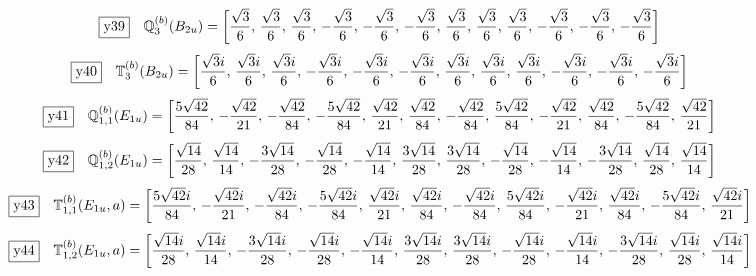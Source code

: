 \documentclass[fleqn,10pt,landscape]{jsarticle}
\begin{document}
\begin{dmath*}
\fbox{y39}\quad \mathbb{Q}_{3}^{(b)}(B_{2u})=\left[ \frac{\sqrt{3}}{6},\, \frac{\sqrt{3}}{6},\, \frac{\sqrt{3}}{6},\, - \frac{\sqrt{3}}{6},\, - \frac{\sqrt{3}}{6},\, - \frac{\sqrt{3}}{6},\, \frac{\sqrt{3}}{6},\, \frac{\sqrt{3}}{6},\, \frac{\sqrt{3}}{6},\, - \frac{\sqrt{3}}{6},\, - \frac{\sqrt{3}}{6},\, - \frac{\sqrt{3}}{6} \right]
\end{dmath*}
\begin{dmath*}
\fbox{y40}\quad \mathbb{T}_{3}^{(b)}(B_{2u})=\left[ \frac{\sqrt{3} i}{6},\, \frac{\sqrt{3} i}{6},\, \frac{\sqrt{3} i}{6},\, - \frac{\sqrt{3} i}{6},\, - \frac{\sqrt{3} i}{6},\, - \frac{\sqrt{3} i}{6},\, \frac{\sqrt{3} i}{6},\, \frac{\sqrt{3} i}{6},\, \frac{\sqrt{3} i}{6},\, - \frac{\sqrt{3} i}{6},\, - \frac{\sqrt{3} i}{6},\, - \frac{\sqrt{3} i}{6} \right]
\end{dmath*}
\begin{dmath*}
\fbox{y41}\quad \mathbb{Q}_{1,1}^{(b)}(E_{1u})=\left[ \frac{5 \sqrt{42}}{84},\, - \frac{\sqrt{42}}{21},\, - \frac{\sqrt{42}}{84},\, - \frac{5 \sqrt{42}}{84},\, \frac{\sqrt{42}}{21},\, \frac{\sqrt{42}}{84},\, - \frac{\sqrt{42}}{84},\, \frac{5 \sqrt{42}}{84},\, - \frac{\sqrt{42}}{21},\, \frac{\sqrt{42}}{84},\, - \frac{5 \sqrt{42}}{84},\, \frac{\sqrt{42}}{21} \right]
\end{dmath*}
\begin{dmath*}
\fbox{y42}\quad \mathbb{Q}_{1,2}^{(b)}(E_{1u})=\left[ \frac{\sqrt{14}}{28},\, \frac{\sqrt{14}}{14},\, - \frac{3 \sqrt{14}}{28},\, - \frac{\sqrt{14}}{28},\, - \frac{\sqrt{14}}{14},\, \frac{3 \sqrt{14}}{28},\, \frac{3 \sqrt{14}}{28},\, - \frac{\sqrt{14}}{28},\, - \frac{\sqrt{14}}{14},\, - \frac{3 \sqrt{14}}{28},\, \frac{\sqrt{14}}{28},\, \frac{\sqrt{14}}{14} \right]
\end{dmath*}
\begin{dmath*}
\fbox{y43}\quad \mathbb{T}_{1,1}^{(b)}(E_{1u},a)=\left[ \frac{5 \sqrt{42} i}{84},\, - \frac{\sqrt{42} i}{21},\, - \frac{\sqrt{42} i}{84},\, - \frac{5 \sqrt{42} i}{84},\, \frac{\sqrt{42} i}{21},\, \frac{\sqrt{42} i}{84},\, - \frac{\sqrt{42} i}{84},\, \frac{5 \sqrt{42} i}{84},\, - \frac{\sqrt{42} i}{21},\, \frac{\sqrt{42} i}{84},\, - \frac{5 \sqrt{42} i}{84},\, \frac{\sqrt{42} i}{21} \right]
\end{dmath*}
\begin{dmath*}
\fbox{y44}\quad \mathbb{T}_{1,2}^{(b)}(E_{1u},a)=\left[ \frac{\sqrt{14} i}{28},\, \frac{\sqrt{14} i}{14},\, - \frac{3 \sqrt{14} i}{28},\, - \frac{\sqrt{14} i}{28},\, - \frac{\sqrt{14} i}{14},\, \frac{3 \sqrt{14} i}{28},\, \frac{3 \sqrt{14} i}{28},\, - \frac{\sqrt{14} i}{28},\, - \frac{\sqrt{14} i}{14},\, - \frac{3 \sqrt{14} i}{28},\, \frac{\sqrt{14} i}{28},\, \frac{\sqrt{14} i}{14} \right]
\end{dmath*}
\end{document}
